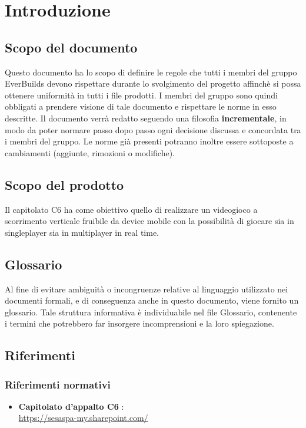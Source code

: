 \section{Introduzione}
	\subsection{Scopo del documento}
		Questo documento ha lo scopo di definire le regole che tutti i membri del gruppo EverBuilds devono rispettare durante lo svolgimento del progetto affinchè si possa ottenere uniformità in tutti i file prodotti.
		I membri del gruppo sono quindi obbligati a prendere visione di tale documento e rispettare le norme in esso descritte.
		Il documento verrà redatto seguendo una filosofia \textbf{incrementale}, in modo da poter normare passo dopo passo ogni decisione discussa e concordata tra i membri del gruppo. Le norme già presenti potranno inoltre essere sottoposte a cambiamenti (aggiunte, rimozioni o modifiche).
	\subsection{Scopo del prodotto}
		Il capitolato C6 ha come obiettivo quello di realizzare un videogioco a scorrimento verticale fruibile da device mobile con la possibilità di giocare sia in singleplayer sia in multiplayer in real time. 
	\subsection{Glossario}
		Al fine di evitare ambiguità o incongruenze relative al linguaggio utilizzato nei documenti formali, e di conseguenza anche in questo documento, viene fornito un glossario. Tale struttura informativa è individuabile nel file Glossario, contenente i termini che potrebbero far insorgere incomprensioni e la loro spiegazione.
	\subsection{Riferimenti}
		\subsubsection{Riferimenti normativi}
			\begin{itemize}
				\item\textbf{Capitolato d'appalto C6} : \\
				\href{https://sesaspa-my.sharepoint.com/personal/s_dindo_vargroup_it/_layouts/15/onedrive.aspx?id=\%2Fpersonal\%2Fs\%5Fdindo\%5Fvargroup\%5Fit\%2FDocuments\%2FDownload\%2Fupload\%2FIngegneria\%5Fsoftware\%2FCapitolato\%5FIngegneria\%5Fsoftware\%2Epdf&parent=\%2Fpersonal\%2Fs\%5Fdindo\%5Fvargroup\%5Fit\%2FDocuments\%2FDownload\%2Fupload\%2FIngegneria\%5Fsoftware&originalPath=aHR0cHM6Ly9zZXNhc3BhLW15LnNoYXJlcG9pbnQuY29tLzpiOi9nL3BlcnNvbmFsL3NfZGluZG9fdmFyZ3JvdXBfaXQvRVRodmF5MGY2S1ZDb1h5ZFlPY2UybGtCdC1NWWNuVzF5YWZSWEZYVklPSXNIZz9ydGltZT13T1VuQ0F5czJFZw }{https://sesaspa-my.sharepoint.com/}
			\end{itemize}
